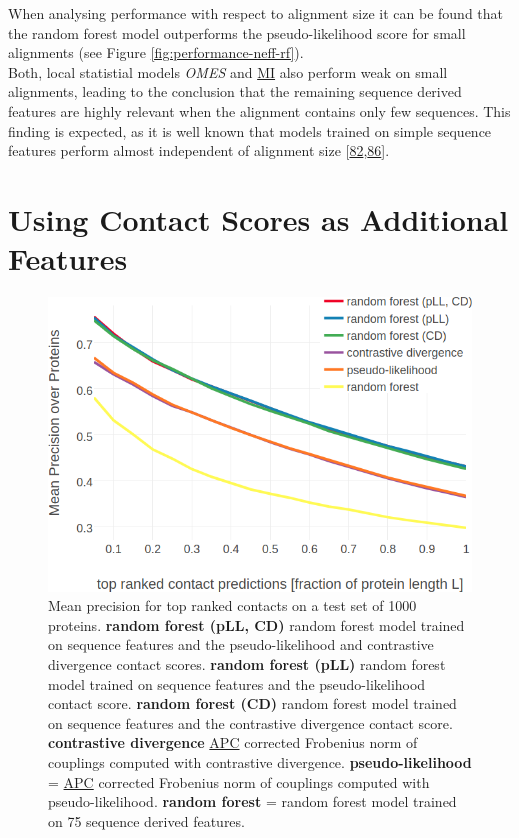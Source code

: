 \documentclass[11pt,a4paper,twoside]{book}
\theoremstyle{definition}
\theoremstyle{definition}
\theoremstyle{remark}
\begin{document}
When analysing performance with respect to alignment size it can be
found that the random forest model outperforms the pseudo-likelihood
score for small alignments (see Figure \ref{fig:performance-neff-rf}).\\
Both, local statistial models \emph{OMES} and
\protect\hyperlink{abbrev}{MI} also perform weak on small alignments,
leading to the conclusion that the remaining sequence derived features
are highly relevant when the alignment contains only few sequences. This
finding is expected, as it is well known that models trained on simple
sequence features perform almost independent of alignment size
{[}\protect\hyperlink{ref-Skwark2016}{82},\protect\hyperlink{ref-Stahl2017}{86}{]}.

\section{Using Contact Scores as Additional
Features}\label{using-contact-scores-as-additional-features}















\begin{figure}
\includegraphics[width=0.9\linewidth]{img/random_forest_contact_prior/additional_contat_score_features/precision_vs_rank_rf_pll_cd} \caption{Mean precision for top
ranked contacts on a test set of 1000 proteins. \textbf{random forest
(pLL, CD)} random forest model trained on sequence features and the
pseudo-likelihood and contrastive divergence contact scores.
\textbf{random forest (pLL)} random forest model trained on sequence
features and the pseudo-likelihood contact score. \textbf{random forest
(CD)} random forest model trained on sequence features and the
contrastive divergence contact score. \textbf{contrastive divergence}
\protect\hyperlink{abbrev}{APC} corrected Frobenius norm of couplings
computed with contrastive divergence. \textbf{pseudo-likelihood} =
\protect\hyperlink{abbrev}{APC} corrected Frobenius norm of couplings
computed with pseudo-likelihood. \textbf{random forest} = random forest
model trained on 75 sequence derived features.}\label{fig:performance-rf-additional-features}
\end{figure}
\end{document}
